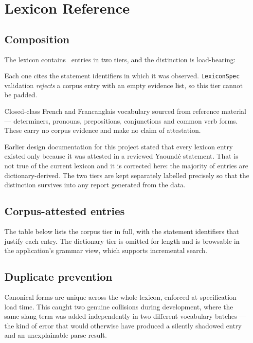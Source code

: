 \section{Lexicon Reference}\label{app:lexicon}

\subsection{Composition}

The lexicon contains \LexiconTotal\ entries in two tiers, and the distinction is
load-bearing:

\begin{description}[leftmargin=1.4em, style=nextline, font=\ttfamily]
  \item[corpus (\LexiconCorpus\ entries)] Each one cites the statement identifiers in which
    it was observed. \texttt{LexiconSpec} validation \emph{rejects} a corpus entry with an
    empty evidence list, so this tier cannot be padded.
  \item[dictionary (\LexiconDictionary\ entries)] Closed-class French and Francanglais
    vocabulary sourced from reference material --- determiners, pronouns, prepositions,
    conjunctions and common verb forms. These carry no corpus evidence and make no claim of
    attestation.
\end{description}

\begin{limitbox}
Earlier design documentation for this project stated that every lexicon entry existed only
because it was attested in a reviewed Yaound\'e statement. That is not true of the current
lexicon and it is corrected here: the majority of entries are dictionary-derived. The two
tiers are kept separately labelled precisely so that the distinction survives into any
report generated from the data.
\end{limitbox}

\subsection{Corpus-attested entries}

The table below lists the corpus tier in full, with the statement identifiers that justify
each entry. The dictionary tier is omitted for length and is browsable in the application's
grammar view, which supports incremental search.



\subsection{Duplicate prevention}

Canonical forms are unique across the whole lexicon, enforced at specification load time.
This caught two genuine collisions during development, where the same slang term was added
independently in two different vocabulary batches --- the kind of error that would otherwise
have produced a silently shadowed entry and an unexplainable parse result.
